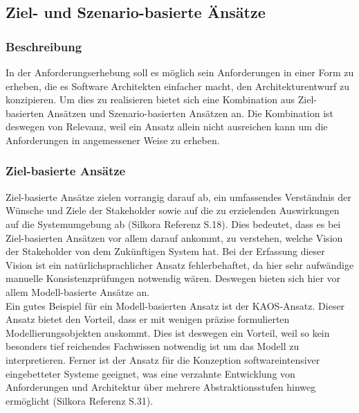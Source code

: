 \subsection{Ziel- und Szenario-basierte Änsätze}
\subsubsection{Beschreibung}
In der Anforderungserhebung soll es möglich sein Anforderungen in einer Form zu erheben, die es Software Architekten einfacher macht, den Architekturentwurf zu konzipieren. Um dies zu realisieren bietet sich eine Kombination aus Ziel-basierten Ansätzen und Szenario-basierten Ansätzen an. Die Kombination ist deswegen von Relevanz, weil ein Ansatz allein nicht ausreichen kann um die Anforderungen in angemessener Weise zu erheben.
\subsubsection{Ziel-basierte Ansätze}
Ziel-basierte Ansätze zielen vorrangig darauf ab, ein umfassendes Verständnis der Wünsche und Ziele der Stakeholder sowie auf die zu erzielenden Auswirkungen auf die Systemumgebung ab (Silkora Referenz S.18). Dies bedeutet, dass es bei Ziel-basierten Ansätzen vor allem darauf ankommt, zu verstehen, welche Vision der Stakeholder von dem Zukünftigen System hat. Bei der Erfassung dieser Vision ist ein natürlichsprachlicher Ansatz fehlerbehaftet, da hier sehr aufwändige manuelle Konsistenzprüfungen notwendig wären. Deswegen bieten sich hier vor allem Modell-basierte Ansätze an.\\
Ein gutes Beispiel für ein Modell-basierten Ansatz ist der KAOS-Ansatz. Dieser Ansatz bietet den Vorteil, dass er mit wenigen präzise formulierten Modellierungsobjekten auskommt. Dies ist deswegen ein Vorteil, weil so kein besonders tief reichendes Fachwissen notwendig ist um das Modell zu interpretieren. Ferner ist der Ansatz für die Konzeption softwareintensiver eingebetteter Systeme geeignet, was eine verzahnte Entwicklung von Anforderungen und Architektur über mehrere Abstraktionsstufen hinweg ermöglicht (Silkora Referenz S.31).
